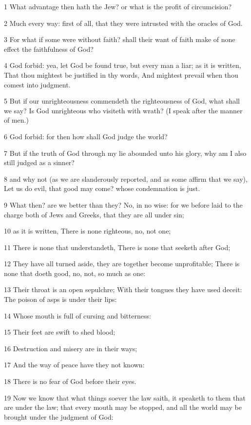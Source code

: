 \par 1 What advantage then hath the Jew? or what is the profit of circumcision?
\par 2 Much every way: first of all, that they were intrusted with the oracles of God.
\par 3 For what if some were without faith? shall their want of faith make of none effect the faithfulness of God?
\par 4 God forbid: yea, let God be found true, but every man a liar; as it is written, That thou mightest be justified in thy words, And mightest prevail when thou comest into judgment.
\par 5 But if our unrighteousness commendeth the righteousness of God, what shall we say? Is God unrighteous who visiteth with wrath? (I speak after the manner of men.)
\par 6 God forbid: for then how shall God judge the world?
\par 7 But if the truth of God through my lie abounded unto his glory, why am I also still judged as a sinner?
\par 8 and why not (as we are slanderously reported, and as some affirm that we say), Let us do evil, that good may come? whose condemnation is just.
\par 9 What then? are we better than they? No, in no wise: for we before laid to the charge both of Jews and Greeks, that they are all under sin;
\par 10 as it is written, There is none righteous, no, not one;
\par 11 There is none that understandeth, There is none that seeketh after God;
\par 12 They have all turned aside, they are together become unprofitable; There is none that doeth good, no, not, so much as one:
\par 13 Their throat is an open sepulchre; With their tongues they have used deceit: The poison of asps is under their lips:
\par 14 Whose mouth is full of cursing and bitterness:
\par 15 Their feet are swift to shed blood;
\par 16 Destruction and misery are in their ways;
\par 17 And the way of peace have they not known:
\par 18 There is no fear of God before their eyes.
\par 19 Now we know that what things soever the law saith, it speaketh to them that are under the law; that every mouth may be stopped, and all the world may be brought under the judgment of God:
